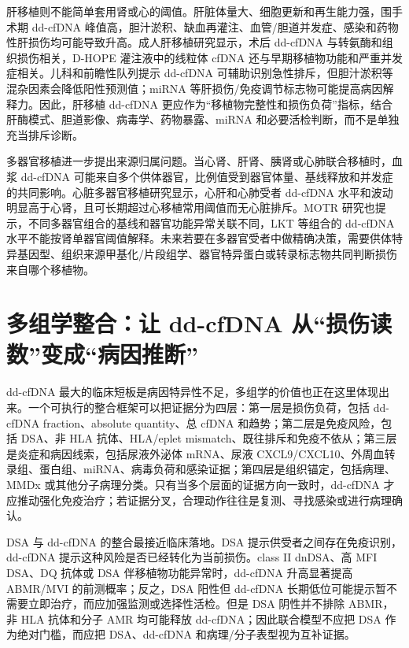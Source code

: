 \documentclass[11pt,a4paper]{article}
\begin{document}
肝移植则不能简单套用肾或心的阈值。肝脏体量大、细胞更新和再生能力强，围手术期 dd-cfDNA
峰值高，胆汁淤积、缺血再灌注、血管/胆道并发症、感染和药物性肝损伤均可能导致升高。成人肝移植研究显示，术后
dd-cfDNA 与转氨酶和组织损伤相关，D-HOPE
灌注液中的线粒体 cfDNA 还与早期移植物功能和严重并发症相关\cite{circulatingcellfree2024}。儿科和前瞻性队列提示
dd-cfDNA 可辅助识别急性排斥，但胆汁淤积等混杂因素会降低阳性预测值；miRNA
等肝损伤/免疫调节标志物可能提高病因解释力\cite{preliminaryclinicalexperience2021, donorderivedcell20252, advancesandchallenges2025}。因此，肝移植 dd-cfDNA
更应作为``移植物完整性和损伤负荷''指标，结合肝酶模式、胆道影像、病毒学、药物暴露、miRNA
和必要活检判断，而不是单独充当排斥诊断。

多器官移植进一步提出来源归属问题。当心肾、肝肾、胰肾或心肺联合移植时，血浆 dd-cfDNA
可能来自多个供体器官，比例值受到器官体量、基线释放和并发症的共同影响。心脏多器官移植研究显示，心肝和心肺受者
dd-cfDNA 水平和波动明显高于心肾，且可长期超过心移植常用阈值而无心脏排斥\cite{clinicalutilityof2024}。MOTR
研究也提示，不同多器官组合的基线和器官功能异常关联不同，LKT 等组合的 dd-cfDNA
水平不能按肾单器官阈值解释\cite{donorderivedcell2026}。未来若要在多器官受者中做精确决策，需要供体特异基因型、组织来源甲基化/片段组学、器官特异蛋白或转录标志物共同判断损伤来自哪个移植物。

\section{多组学整合：让 dd-cfDNA
从``损伤读数''变成``病因推断''}\label{ux591aux7ec4ux5b66ux6574ux5408ux8ba9-dd-cfdna-ux4eceux635fux4f24ux8bfbux6570ux53d8ux6210ux75c5ux56e0ux63a8ux65ad}

dd-cfDNA
最大的临床短板是病因特异性不足，多组学的价值也正在这里体现出来。一个可执行的整合框架可以把证据分为四层：第一层是损伤负荷，包括
dd-cfDNA fraction、absolute quantity、总 cfDNA
和趋势；第二层是免疫风险，包括 DSA、非 HLA
抗体、HLA/eplet mismatch、既往排斥和免疫不依从；第三层是炎症和病因线索，包括尿液外泌体
mRNA、尿液 CXCL9/CXCL10、外周血转录组、蛋白组、miRNA、病毒负荷和感染证据；第四层是组织锚定，包括病理、MMDx
或其他分子病理分类。只有当多个层面的证据方向一致时，dd-cfDNA
才应推动强化免疫治疗；若证据分叉，合理动作往往是复测、寻找感染或进行病理确认。

DSA 与 dd-cfDNA 的整合最接近临床落地。DSA
提示供受者之间存在免疫识别，dd-cfDNA
提示这种风险是否已经转化为当前损伤。class II dnDSA、高 MFI DSA、DQ
抗体或 DSA 伴移植物功能异常时，dd-cfDNA
升高显著提高 ABMR/MVI 的前测概率；反之，DSA 阳性但 dd-cfDNA
长期低位可能提示暂不需要立即治疗，而应加强监测或选择性活检\cite{donorderivedcell2022, combiningdonorderived20221, perspectivefordonor2024}。但是
DSA 阴性并不排除 ABMR，非 HLA
抗体和分子 AMR 均可能释放 dd-cfDNA；因此联合模型不应把 DSA
作为绝对门槛，而应把 DSA、dd-cfDNA 和病理/分子表型视为互补证据\cite{antibodymediatedrejection2022, utilityofdonor2021}。
\end{document}
